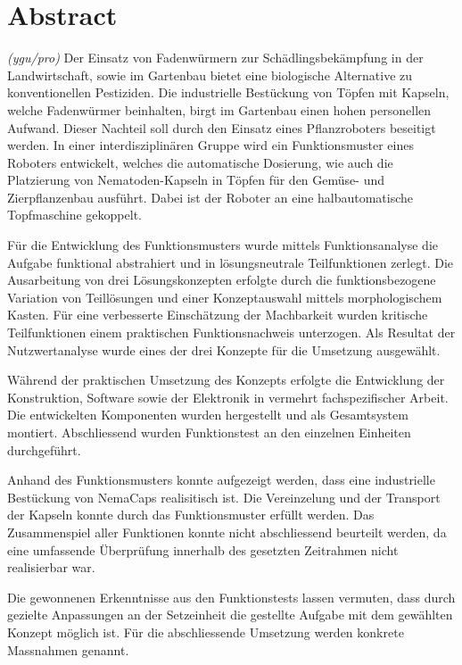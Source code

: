 \newpage
\section{Abstract}
\textit{(ygu/pro)} Der Einsatz von Fadenwürmern zur Schädlingsbekämpfung in der Landwirtschaft, sowie im Gartenbau bietet eine biologische Alternative zu konventionellen Pestiziden. Die industrielle Bestückung von Töpfen mit Kapseln, welche Fadenwürmer beinhalten, birgt im Gartenbau einen hohen personellen Aufwand. Dieser Nachteil soll durch den Einsatz eines Pflanzroboters beseitigt werden. In einer interdisziplinären Gruppe wird  ein Funktionsmuster eines Roboters entwickelt, welches die automatische Dosierung, wie auch die Platzierung von Nematoden-Kapseln in Töpfen für den Gemüse- und Zierpflanzenbau ausführt. Dabei ist der Roboter an eine halbautomatische Topfmaschine gekoppelt.
\newline

Für die Entwicklung des Funktionsmusters wurde mittels Funktionsanalyse die Aufgabe funktional abstrahiert und in lösungsneutrale Teilfunktionen zerlegt. Die Ausarbeitung von drei Lösungskonzepten erfolgte durch die funktionsbezogene Variation von Teillösungen und einer Konzeptauswahl mittels morphologischem Kasten. Für eine verbesserte Einschätzung der Machbarkeit wurden kritische Teilfunktionen einem praktischen Funktionsnachweis unterzogen. Als Resultat der Nutzwertanalyse wurde eines der drei Konzepte für die Umsetzung ausgewählt.
\newline

Während der praktischen Umsetzung des Konzepts erfolgte die Entwicklung der Konstruktion, Software sowie der Elektronik in vermehrt fachspezifischer Arbeit. Die entwickelten Komponenten wurden hergestellt und als Gesamtsystem montiert. Abschliessend wurden Funktionstest an den einzelnen Einheiten durchgeführt.
\newline

Anhand des Funktionsmusters konnte aufgezeigt werden, dass eine industrielle Bestückung von NemaCaps realisitisch ist. Die Vereinzelung und der Transport der Kapseln konnte durch das Funktionsmuster erfüllt werden. Das Zusammenspiel aller Funktionen konnte nicht abschliessend beurteilt werden, da eine umfassende Überprüfung innerhalb des gesetzten Zeitrahmen nicht realisierbar war.
\newline

Die gewonnenen Erkenntnisse aus den Funktionstests lassen vermuten, dass durch gezielte Anpassungen an der Setzeinheit die gestellte Aufgabe mit dem gewählten Konzept möglich ist. Für die abschliessende Umsetzung werden konkrete Massnahmen genannt.

